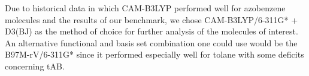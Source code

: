 %
%
Due to historical data in which CAM-B3LYP performed well for azobenzene molecules and the results of our benchmark, we chose CAM-B3LYP/6-311G* + D3(BJ) as the method of choice for further analysis of the molecules of interest.\\
An alternative functional and basis set combination one could use would be the B97M-rV/6-311G* since it performed especially well for tolane with some deficits concerning tAB.
\begin{comment}
The calculated energies for the excited states transitions derived by it tended to be a bit higher than the experimental values:
\begin{equation*}
\begin{split}
    E_{\text{Comp}}(\text{ES1}) &= \SI{2.877}{\eV} \\
    E_{\text{Exp}}(\text{ES1}) &= \SI{2.82}{\eV}
\end{split}
\end{equation*}
for the first excited state and
\begin{equation*}
\begin{split}
    E_{\text{Comp}}(\text{ES1}) &= \SI{4.836}{\eV} \\
    E_{\text{Exp}}(\text{ES1}) &= \SI{4.77}{\eV}
\end{split}
\end{equation*}
for the second excited state.
\end{comment}
%
%
